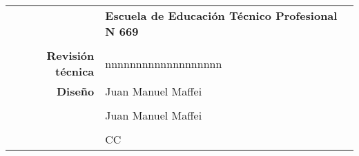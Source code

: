 \thispagestyle{empty}

\begin{center}

\begin{tabular}{r:l}
						& \textbf{\Large Escuela de Educación Técnico Profesional N 669}				\\
						&														\\
	{\bf Revisión técnica} 		& nnnnnnnnnnnnnnnnnnn					\\
	{\bf Diseño}				& Juan Manuel Maffei				\\
						&														\\
						&  Juan Manuel Maffei	\\
						&														\\
						& CC					\\

\end{tabular}

\end{center}

\newpage
